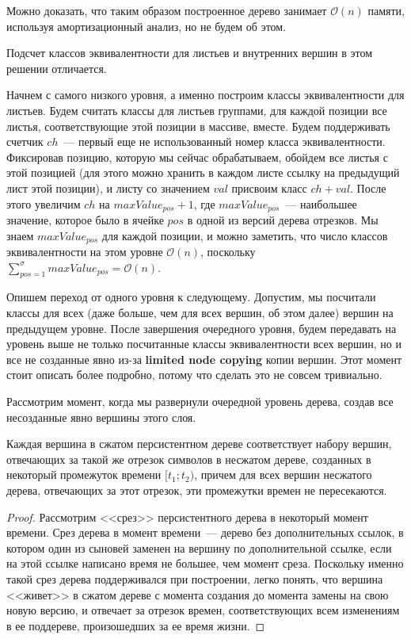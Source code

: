 Можно доказать, что таким образом построенное дерево занимает $\mathcal{O}(n)$ памяти, используя амортизационный анализ, но не будем об этом. 

Подсчет классов эквивалентности для листьев и внутренних вершин в этом решении отличается.

Начнем с самого низкого уровня, а именно построим классы эквивалентности для листьев. Будем считать классы для листьев группами, для каждой позиции все листья, соответствующие этой позиции в массиве, вместе. Будем поддерживать счетчик $ch$~--- первый еще не использованный номер класса эквивалентности. Фиксировав позицию, которую мы сейчас обрабатываем, обойдем все листья с этой позицией (для этого можно хранить в каждом листе ссылку на предыдущий лист этой позиции), и листу со значением $val$ присвоим класс $ch+val$. После этого увеличим $ch$ на $maxValue_{pos}+1$, где $maxValue_{pos}$~--- наибольшее значение, которое было в ячейке $pos$ в одной из версий дерева отрезков. Мы знаем $maxValue_{pos}$ для каждой позиции, и можно заметить, что число классов эквивалентности на этом уровне $\mathcal{O}(n)$, поскольку $\sum \limits_{pos=1}^{\sigma} maxValue_{pos} = \mathcal{O}(n)$.

Опишем переход от одного уровня к следующему. Допустим, мы посчитали классы для всех (даже больше, чем для всех вершин, об этом далее) вершин на предыдущем уровне. После завершения очередного уровня, будем передавать на уровень выше не только посчитанные классы эквивалентности всех вершин, но и все не созданные явно из-за \textbf{limited node copying} копии вершин. Этот момент стоит описать более подробно, потому что сделать это не совсем тривиально. 

Рассмотрим момент, когда мы развернули очередной уровень дерева, создав все несозданные явно вершины этого слоя.

\begin{lemma}
Каждая вершина в сжатом персистентном дереве соответствует набору вершин, отвечающих за такой же отрезок символов в несжатом дереве, созданных в некоторый промежуток времени $[t_1; t_2)$, причем для всех вершин несжатого дерева, отвечающих за этот отрезок, эти промежутки времен не пересекаются.
\end{lemma}

\begin{proof}
Рассмотрим <<срез>> персистентного дерева в некоторый момент времени. Срез дерева в момент времени~--- дерево без дополнительных ссылок, в котором один из сыновей заменен на вершину по дополнительной ссылке, если на этой ссылке написано время не большее, чем момент среза. Поскольку именно такой срез дерева поддерживался при построении, легко понять, что вершина <<живет>> в сжатом дереве с момента создания до момента замены на свою новую версию, и отвечает за отрезок времен, соответствующих всем изменениям в ее поддереве, произошедших за ее время жизни.
\end{proof} 

